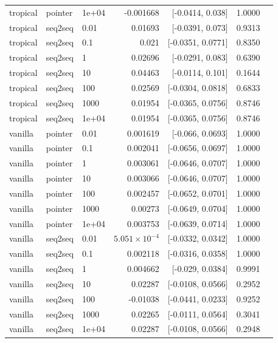 \documentclass[10pt]{article}
\begin{document}
{\begin{longtable}{lllrrrl}
tropical & pointer & 1e+04 & -0.001668 & [-0.0414, 0.038] & 1.0000 & \\
tropical & seq2seq & 0.01 & 0.01693 & [-0.0391, 0.073] & 0.9313 & \\
tropical & seq2seq & 0.1 & 0.021 & [-0.0351, 0.0771] & 0.8350 & \\
tropical & seq2seq & 1 & 0.02696 & [-0.0291, 0.083] & 0.6390 & \\
tropical & seq2seq & 10 & 0.04463 & [-0.0114, 0.101] & 0.1644 & \\
tropical & seq2seq & 100 & 0.02569 & [-0.0304, 0.0818] & 0.6833 & \\
tropical & seq2seq & 1000 & 0.01954 & [-0.0365, 0.0756] & 0.8746 & \\
tropical & seq2seq & 1e+04 & 0.01954 & [-0.0365, 0.0756] & 0.8746 & \\
vanilla & pointer & 0.01 & 0.001619 & [-0.066, 0.0693] & 1.0000 & \\
vanilla & pointer & 0.1 & 0.002041 & [-0.0656, 0.0697] & 1.0000 & \\
vanilla & pointer & 1 & 0.003061 & [-0.0646, 0.0707] & 1.0000 & \\
vanilla & pointer & 10 & 0.003066 & [-0.0646, 0.0707] & 1.0000 & \\
vanilla & pointer & 100 & 0.002457 & [-0.0652, 0.0701] & 1.0000 & \\
vanilla & pointer & 1000 & 0.00273 & [-0.0649, 0.0704] & 1.0000 & \\
vanilla & pointer & 1e+04 & 0.003753 & [-0.0639, 0.0714] & 1.0000 & \\
vanilla & seq2seq & 0.01 & $5.051\times10^{-4}$ & [-0.0332, 0.0342] & 1.0000 & \\
vanilla & seq2seq & 0.1 & 0.002118 & [-0.0316, 0.0358] & 1.0000 & \\
vanilla & seq2seq & 1 & 0.004662 & [-0.029, 0.0384] & 0.9991 & \\
vanilla & seq2seq & 10 & 0.02287 & [-0.0108, 0.0566] & 0.2952 & \\
vanilla & seq2seq & 100 & -0.01038 & [-0.0441, 0.0233] & 0.9252 & \\
vanilla & seq2seq & 1000 & 0.02265 & [-0.0111, 0.0564] & 0.3041 & \\
vanilla & seq2seq & 1e+04 & 0.02287 & [-0.0108, 0.0566] & 0.2948 & \\
\bottomrule
\end{longtable}
}
\end{document}

